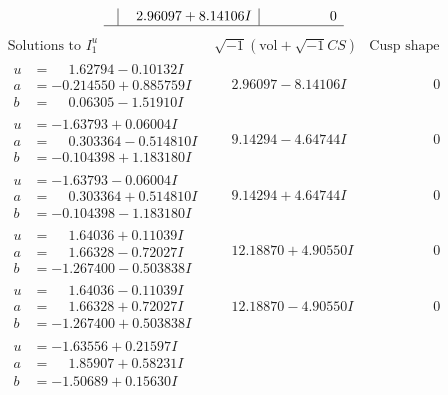 \documentclass[1p]{elsarticle_modified}
\theoremstyle{definition}
\newcommand{\I}{\sqrt{-1}}
\begin{document}
$$\begin{array}{c|c|c}
 & \phantom{-}2.96097 + 8.14106 I & \phantom{-0.000000 } 0\\
 \hline 
 \end{array}$$\newpage$$\begin{array}{c|c|c}  
\text{Solutions to }I^u_{1}& \I (\text{vol} + \sqrt{-1}CS) & \text{Cusp shape}\\
 \hline 
\begin{aligned}
u &= \phantom{-}1.62794 - 0.10132 I \\
a &= -0.214550 + 0.885759 I \\
b &= \phantom{-}0.06305 - 1.51910 I\end{aligned}
 & \phantom{-}2.96097 - 8.14106 I & \phantom{-0.000000 } 0 \\ \hline\begin{aligned}
u &= -1.63793 + 0.06004 I \\
a &= \phantom{-}0.303364 - 0.514810 I \\
b &= -0.104398 + 1.183180 I\end{aligned}
 & \phantom{-}9.14294 - 4.64744 I & \phantom{-0.000000 } 0 \\ \hline\begin{aligned}
u &= -1.63793 - 0.06004 I \\
a &= \phantom{-}0.303364 + 0.514810 I \\
b &= -0.104398 - 1.183180 I\end{aligned}
 & \phantom{-}9.14294 + 4.64744 I & \phantom{-0.000000 } 0 \\ \hline\begin{aligned}
u &= \phantom{-}1.64036 + 0.11039 I \\
a &= \phantom{-}1.66328 - 0.72027 I \\
b &= -1.267400 - 0.503838 I\end{aligned}
 & \phantom{-}12.18870 + 4.90550 I & \phantom{-0.000000 } 0 \\ \hline\begin{aligned}
u &= \phantom{-}1.64036 - 0.11039 I \\
a &= \phantom{-}1.66328 + 0.72027 I \\
b &= -1.267400 + 0.503838 I\end{aligned}
 & \phantom{-}12.18870 - 4.90550 I & \phantom{-0.000000 } 0 \\ \hline\begin{aligned}
u &= -1.63556 + 0.21597 I \\
a &= \phantom{-}1.85907 + 0.58231 I \\
b &= -1.50689 + 0.15630 I\end{aligned}

\end{array}$$
\end{document}
